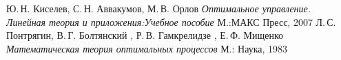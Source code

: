\documentclass[10pt]{article}
\begin{document}
\begin{thebibliography}{0}
Ю.\,Н. Киселев, С.\,Н. Аввакумов, М.\,В. Орлов \emph{Оптимальное управление. Линейная теория и приложения:Учебное пособие} М.:МАКС Пресс, 2007
Л.\,С. Понтрягин, В.\,Г. Болтянский , Р.\,В. Гамкрелидзе , Е.\,Ф. Мищенко \emph{Математическая теория оптимальных процессов} М.: Наука, 1983
\end{thebibliography}
\end{document}
